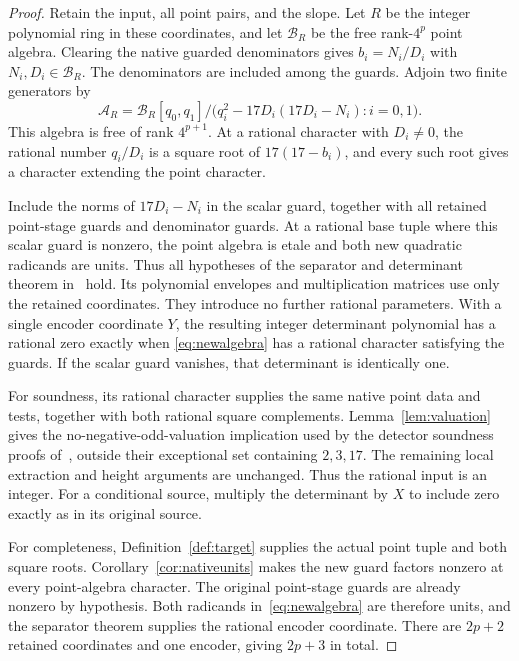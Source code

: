 \documentclass[11pt,a4paper]{article}
\theoremstyle{definition}\newtheorem{definition}[theorem]{Definition}
\begin{document}
\begin{proof}
Retain the input, all point pairs, and the slope. Let $R$ be the
integer polynomial ring in these coordinates, and let $\mathcal B_R$
be the free rank-$4^p$ point algebra. Clearing the native guarded
denominators gives $b_i=N_i/D_i$ with $N_i,D_i\in\mathcal B_R$.
The denominators are included among the guards. Adjoin two finite
generators by
\begin{equation}\label{eq:newalgebra}
\mathcal A_R=
\mathcal B_R[q_0,q_1]/
\bigl(q_i^2-17D_i(17D_i-N_i):i=0,1\bigr).
\end{equation}
This algebra is free of rank $4^{p+1}$. At a rational character with
$D_i\ne0$, the rational number $q_i/D_i$ is a square root of
$17(17-b_i)$, and every such root gives a character extending the
point character.

Include the norms of $17D_i-N_i$ in the scalar guard, together with
all retained point-stage guards and denominator guards. At a rational
base tuple where this scalar guard is nonzero, the point algebra is
etale and both new quadratic radicands are units. Thus all hypotheses
of the separator and determinant theorem in~\cite[Section 6]{Unit}
hold. Its polynomial envelopes and multiplication matrices use only
the retained coordinates. They introduce no further rational
parameters. With a single encoder coordinate $Y$, the resulting
integer determinant polynomial has a rational zero exactly when
\eqref{eq:newalgebra} has a rational character satisfying the guards.
If the scalar guard vanishes, that determinant is identically one.

For soundness, its rational character supplies the same native point
data and tests, together with both rational square complements.
Lemma~\ref{lem:valuation} gives the no-negative-odd-valuation
implication used by the detector soundness proofs of~\cite{General,Conditional}, outside their
exceptional set containing $2,3,17$. The remaining local extraction
and height arguments are unchanged. Thus the rational input is an
integer. For a conditional source, multiply the determinant by $X$
to include zero exactly as in its original source.

For completeness, Definition~\ref{def:target} supplies the actual
point tuple and both square roots. Corollary~\ref{cor:nativeunits}
makes the new guard factors nonzero at every point-algebra character.
The original point-stage guards are already nonzero by hypothesis.
Both radicands in~\eqref{eq:newalgebra} are therefore units, and the
separator theorem supplies the rational encoder coordinate. There are
$2p+2$ retained coordinates and one encoder, giving $2p+3$ in total.
\end{proof}
\end{document}
